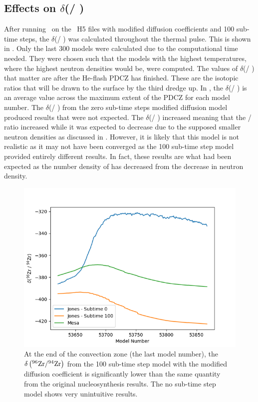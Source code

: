 \documentclass[fleqn,usenatbib]{mnras}
\begin{document}
\subsection{Effects on $\delta$(\zirconium[96] / \zirconium[94])}
\label{sec:zr_zr}

After running \mppnp~on the \MESA~H5 files with modified diffusion coefficients and 100 sub-time steps, the $\delta$(\zirconium[96] / \zirconium[94]) was calculated throughout the thermal pulse. This is shown in . Only the last 300 models were calculated due to the computational time needed. They were chosen such that the models with the highest temperatures, where the highest neutron densities would be, were computed. The values of $\delta$(\zirconium[96] / \zirconium[94]) that matter are after the He-flash PDCZ has finished. These are the isotopic ratios that will be drawn to the surface by the third dredge up. In , the $\delta$(\zirconium[96] / \zirconium[94]) is an average value across the maximum extent of the PDCZ for each model number. The $\delta$(\zirconium[96] / \zirconium[94]) from the zero sub-time steps modified diffusion model produced results that were not expected. The $\delta$(\zirconium[96] / \zirconium[94]) increased meaning that the \zirconium[96] / \zirconium[94] ratio increased while it was expected to decrease due to the supposed smaller neutron densities as discussed in . However, it is likely that this model is not realistic as it may not have been converged as the 100 sub-time step model provided entirely different results. In fact, these results are what had been expected as the number density of \zirconium[96] has decreased from the decrease in neutron density. 

\begin{figure}
   \includegraphics[width=1\columnwidth]{figs/JonesS1_zr.png}
   \caption{At the end of the convection zone (the last model number), the $\delta\left(\zirconium[96] / \zirconium[94]\right)$ from the 100 sub-time step model with the modified diffusion coefficient is significantly lower than the same quantity from the original nucleosynthesis results. The no sub-time step model shows very unintuitive results.}
\end{figure}
\end{document}
